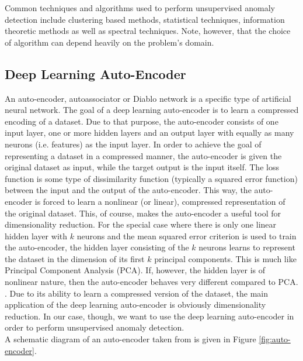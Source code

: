 \documentclass{vldb}
\begin{document}
Common techniques and algorithms used to perform unsupervised anomaly detection include clustering based methods, statistical techniques, information theoretic methods as well as spectral techniques. Note, however, that the choice of algorithm can depend heavily on the problem's domain.


\subsection{Deep Learning Auto-Encoder}
\label{subsec:Intro-deep}
An auto-encoder, autoassociator or Diablo network is a specific type of artificial neural network. The goal of a deep learning auto-encoder is to learn a compressed encoding of a dataset. Due to that purpose, the auto-encoder consists of one input layer, one or more hidden layers and an output layer with equally as many neurons (i.e. features) as the input layer.  In order to achieve the goal of representing a dataset in a compressed manner, the auto-encoder is given the original dataset as input, while the target output is the input itself. \cite{rep:u-montreal} The loss function is some type of dissimilarity function (typically a squared error function) between the input and the output of the auto-encoder. This way, the auto-encoder is forced to learn a nonlinear (or linear), compressed representation of the original dataset. This, of course, makes the auto-encoder a useful tool for dimensionality reduction. For the special case where there is only one linear hidden layer with $k$ neurons and the mean squared error criterion is used to train the auto-encoder, the hidden layer consisting of the $k$ neurons learns to represent the dataset in the dimension of its first $k$ principal components. \cite{rep:u-montreal} This is much like Principal Component Analysis (PCA). If, however, the hidden layer is of nonlinear nature, then the auto-encoder behaves very different compared to PCA. \cite{article:nonlinear-autoassociator}.
Due to its ability to learn a compressed version of the dataset, the main application of the deep learning auto-encoder is obviously dimensionality reduction. In our case, though, we want to use the deep learning auto-encoder in order to perform unsupervised anomaly detection. \\
A schematic diagram of an auto-encoder taken from \cite{article:astronomy} is given in Figure \ref{fig:auto-encoder}. 
\end{document}
